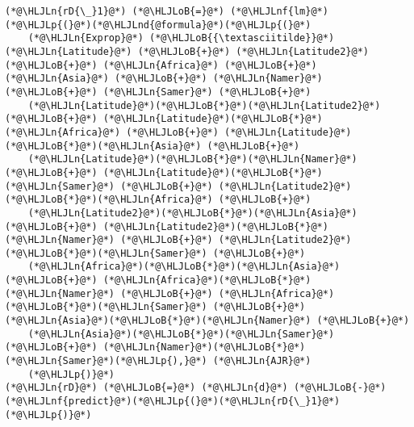 \documentclass[12pt,a4paper]{article}
\newcommand{\HLJLn}[1]{#1}
\newcommand{\HLJLnd}[1]{\textcolor[RGB]{214,102,97}{#1}}
\newcommand{\HLJLnf}[1]{\textcolor[RGB]{66,102,213}{#1}}
\newcommand{\HLJLoB}[1]{\textcolor[RGB]{102,102,102}{\textbf{#1}}}
\newcommand{\HLJLp}[1]{#1}
\begin{document}
\begin{lstlisting}
(*@\HLJLn{rD{\_}1}@*) (*@\HLJLoB{=}@*) (*@\HLJLnf{lm}@*)(*@\HLJLp{(}@*)(*@\HLJLnd{@formula}@*)(*@\HLJLp{(}@*)
    (*@\HLJLn{Exprop}@*) (*@\HLJLoB{{\textasciitilde}}@*) (*@\HLJLn{Latitude}@*) (*@\HLJLoB{+}@*) (*@\HLJLn{Latitude2}@*) (*@\HLJLoB{+}@*) (*@\HLJLn{Africa}@*) (*@\HLJLoB{+}@*) (*@\HLJLn{Asia}@*) (*@\HLJLoB{+}@*) (*@\HLJLn{Namer}@*) (*@\HLJLoB{+}@*) (*@\HLJLn{Samer}@*) (*@\HLJLoB{+}@*) 
    (*@\HLJLn{Latitude}@*)(*@\HLJLoB{*}@*)(*@\HLJLn{Latitude2}@*) (*@\HLJLoB{+}@*) (*@\HLJLn{Latitude}@*)(*@\HLJLoB{*}@*)(*@\HLJLn{Africa}@*) (*@\HLJLoB{+}@*) (*@\HLJLn{Latitude}@*)(*@\HLJLoB{*}@*)(*@\HLJLn{Asia}@*) (*@\HLJLoB{+}@*) 
    (*@\HLJLn{Latitude}@*)(*@\HLJLoB{*}@*)(*@\HLJLn{Namer}@*) (*@\HLJLoB{+}@*) (*@\HLJLn{Latitude}@*)(*@\HLJLoB{*}@*)(*@\HLJLn{Samer}@*) (*@\HLJLoB{+}@*) (*@\HLJLn{Latitude2}@*)(*@\HLJLoB{*}@*)(*@\HLJLn{Africa}@*) (*@\HLJLoB{+}@*) 
    (*@\HLJLn{Latitude2}@*)(*@\HLJLoB{*}@*)(*@\HLJLn{Asia}@*) (*@\HLJLoB{+}@*) (*@\HLJLn{Latitude2}@*)(*@\HLJLoB{*}@*)(*@\HLJLn{Namer}@*) (*@\HLJLoB{+}@*) (*@\HLJLn{Latitude2}@*)(*@\HLJLoB{*}@*)(*@\HLJLn{Samer}@*) (*@\HLJLoB{+}@*) 
    (*@\HLJLn{Africa}@*)(*@\HLJLoB{*}@*)(*@\HLJLn{Asia}@*) (*@\HLJLoB{+}@*) (*@\HLJLn{Africa}@*)(*@\HLJLoB{*}@*)(*@\HLJLn{Namer}@*) (*@\HLJLoB{+}@*) (*@\HLJLn{Africa}@*)(*@\HLJLoB{*}@*)(*@\HLJLn{Samer}@*) (*@\HLJLoB{+}@*) (*@\HLJLn{Asia}@*)(*@\HLJLoB{*}@*)(*@\HLJLn{Namer}@*) (*@\HLJLoB{+}@*) 
    (*@\HLJLn{Asia}@*)(*@\HLJLoB{*}@*)(*@\HLJLn{Samer}@*) (*@\HLJLoB{+}@*) (*@\HLJLn{Namer}@*)(*@\HLJLoB{*}@*)(*@\HLJLn{Samer}@*)(*@\HLJLp{),}@*) (*@\HLJLn{AJR}@*)
    (*@\HLJLp{)}@*)
(*@\HLJLn{rD}@*) (*@\HLJLoB{=}@*) (*@\HLJLn{d}@*) (*@\HLJLoB{-}@*) (*@\HLJLnf{predict}@*)(*@\HLJLp{(}@*)(*@\HLJLn{rD{\_}1}@*)(*@\HLJLp{)}@*)


\end{lstlisting}
\end{document}
